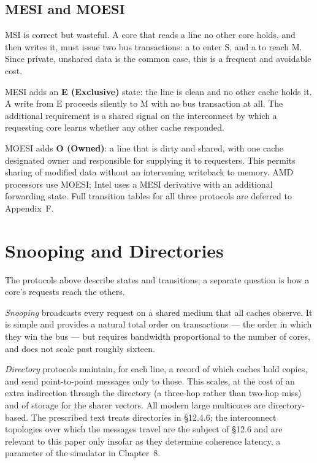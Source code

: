 \subsection{MESI and MOESI}

MSI is correct but wasteful.
A core that reads a line no other core holds, and
then writes it, must issue two bus transactions: a  to enter S, and a
 to reach M. Since private, unshared data is the common case, this is
a frequent and avoidable cost.

MESI adds an \textbf{E (Exclusive)} state: the line is clean and no other cache
holds it.
A write from E proceeds silently to M with no bus transaction at all.
The additional requirement is a shared signal on the interconnect by which a
requesting core learns whether any other cache responded.

MOESI adds \textbf{O (Owned)}: a line that is dirty and shared, with one cache
designated owner and responsible for supplying it to requesters.
This permits
sharing of modified data without an intervening writeback to memory.
AMD
processors use MOESI; Intel uses a MESI derivative with an additional forwarding
state.
Full transition tables for all three protocols are deferred to
Appendix~F.

\section{Snooping and Directories}
\label{sec:snoop-dir}

The protocols above describe states and transitions; a separate question is how a
core's requests reach the others.

\emph{Snooping} broadcasts every request on a shared medium that all caches
observe.
It is simple and provides a natural total order on transactions --- the
order in which they win the bus --- but requires bandwidth proportional to the
number of cores, and does not scale past roughly sixteen.

\emph{Directory} protocols maintain, for each line, a record of which caches hold
copies, and send point-to-point messages only to those.
This scales, at the cost
of an extra indirection through the directory (a three-hop rather than two-hop
miss) and of storage for the sharer vectors.
All modern large multicores are
directory-based. The prescribed text treats directories in \S12.4.6; the
interconnect topologies over which the messages travel are the subject of \S12.6
and are relevant to this paper only insofar as they determine coherence latency,
a parameter of the simulator in Chapter~8.

